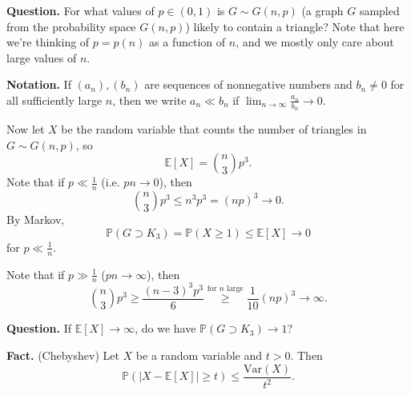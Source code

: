 \documentclass{article}
\theoremstyle{definition}
\begin{document}
\textbf{Question.} For what values of $p \in (0,1)$ is $G \sim G(n,p)$ (a graph $G$ sampled from the probability space $G(n,p)$) likely to contain a triangle? Note that here we're thinking of $p=p(n)$ as a function of $n$, and we mostly only care about large values of $n$.
\vspace{1mm}

\textbf{Notation.} If $(a_n), (b_n)$ are sequences of nonnegative numbers and $b_n \neq 0$ for all sufficiently large $n$, then we write $a_n \ll b_n$ if $\lim_{n \to \infty} \frac{a_n}{b_n} \to 0$.
\vspace{1mm}

Now let $X$ be the random variable that counts the number of triangles in $G \sim G(n,p)$, so \[
\mathbb{E}[X] = {{n}\choose{3}} p^3.
\]
Note that if $p \ll \frac{1}{n}$ (i.e. $pn \to 0$), then \[
{{n}\choose{3}}p^3 \le n^3p^3 = (np)^3 \to 0.
\]
By Markov, $$\mathbb{P}(G \supset K_3) = \mathbb{P}(X\ge 1) \le \mathbb{E}[X] \to 0$$ for $p \ll \frac{1}{n}$.

Note that if $p \gg \frac{1}{n}$ ($pn \to \infty$), then \[
{{n}\choose{3}}p^3 \ge \frac{(n-3)^3 p^3}{6} \stackrel{\text{for }n\text{ large}}{\ge}  \frac{1}{10}(np)^3 \to \infty.
\]

\textbf{Question.} If $\mathbb{E}[X] \to \infty$, do we have $\mathbb{P}(G \supset K_3) \to 1$?
\vspace{1mm}

\textbf{Fact.} (Chebyshev) Let $X$ be a random variable and $t>0$. Then \[
\mathbb{P}(|X - \mathbb{E}[X]| \ge t) \le \frac{\text{Var}(X)}{t^2}.
\]
\vspace{1mm}
\end{document}
